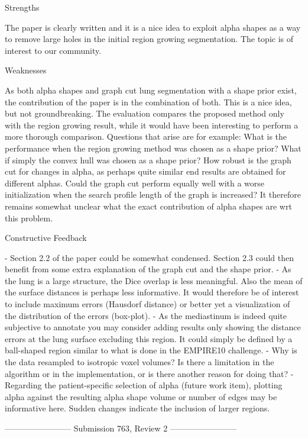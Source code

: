 Strengths

   The paper is clearly written and it is a nice idea to exploit alpha
   shapes as a way to remove large holes in the initial region growing
   segmentation. The topic is of interest to our community.

Weaknesses

   As both alpha shapes and graph cut lung segmentation with a shape prior
   exist, the contribution of the paper is in the combination of both. This
   is a nice idea, but not groundbreaking. The evaluation compares the
   proposed method only with the region growing result, while it would have
   been interesting to perform a more thorough comparison. Questions that
   arise are for example: What is the performance when the region growing
   method was chosen as a shape prior? What if simply the convex hull was
   chosen as a shape prior? How robust is the graph cut for changes in
   alpha, as perhaps quite similar end results are obtained for different
   alphas. Could the graph cut perform equally well with a worse
   initialization when the search profile length of the graph is increased?
   It therefore remains somewhat unclear what the exact contribution of
   alpha shapes are wrt this problem.

Constructive Feedback

   - Section 2.2 of the paper could be somewhat condensed. Section 2.3 could
   then benefit from some extra explanation of the graph cut and the shape
   prior.
   - As the lung is a large structure, the Dice overlap is less meaningful.
   Also the mean of the surface distances is perhaps less informative. It
   would therefore be of interest to include maximum errors (Hausdorf
   distance) or better yet a visualization of the distribution of the errors
   (box-plot).
   - As the mediastinum is indeed quite subjective to annotate you may
   consider adding results only showing the distance errors at the lung
   surface excluding this region. It could simply be defined by a
   ball-shaped region similar to what is done in the EMPIRE10 challenge.
   - Why is the data resampled to isotropic voxel volumes? Is there a
   limitation in the algorithm or in the implementation, or is there another
   reason for doing that?
   - Regarding the patient-specific selection of alpha (future work item),
   plotting alpha against the resulting alpha shape volume or number of
   edges may be informative here. Sudden changes indicate the inclusion of
   larger regions.


------------------------ Submission 763, Review 2 ------------------------

